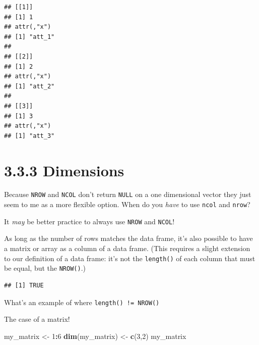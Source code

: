 \documentclass[]{book}
\newenvironment{Shaded}{\begin{snugshade}}{\end{snugshade}}
\newcommand{\DataTypeTok}[1]{\textcolor[rgb]{0.13,0.29,0.53}{#1}}
\newcommand{\DecValTok}[1]{\textcolor[rgb]{0.00,0.00,0.81}{#1}}
\newcommand{\KeywordTok}[1]{\textcolor[rgb]{0.13,0.29,0.53}{\textbf{#1}}}
\newcommand{\NormalTok}[1]{#1}
\newcommand{\OperatorTok}[1]{\textcolor[rgb]{0.81,0.36,0.00}{\textbf{#1}}}
\newcommand{\StringTok}[1]{\textcolor[rgb]{0.31,0.60,0.02}{#1}}
\begin{document}
\begin{verbatim}
## [[1]]
## [1] 1
## attr(,"x")
## [1] "att_1"
## 
## [[2]]
## [1] 2
## attr(,"x")
## [1] "att_2"
## 
## [[3]]
## [1] 3
## attr(,"x")
## [1] "att_3"
\end{verbatim}

\hypertarget{dimensions}{%
\section*{3.3.3 Dimensions}\label{dimensions}}

Because \texttt{NROW} and \texttt{NCOL} don't return \texttt{NULL} on a one dimensional vector they just seem to me as a more flexible option. When do you \emph{have} to use \texttt{ncol} and \texttt{nrow}?

It \emph{may} be better practice to always use \texttt{NROW} and \texttt{NCOL}!

As long as the number of rows matches the data frame, it's also possible to have a matrix or array as a column of a data frame. (This requires a slight extension to our definition of a data frame: it's not the \texttt{length()} of each column that must be equal, but the \texttt{NROW()}.)

\begin{Shaded}
\end{Shaded}

\begin{verbatim}
## [1] TRUE
\end{verbatim}

What's an example of where \texttt{length()\ !=\ NROW()}

The case of a matrix!

\begin{Shaded}
\begin{Highlighting}[]
\NormalTok{my_matrix <-}\StringTok{ }\DecValTok{1}\OperatorTok{:}\DecValTok{6}
\KeywordTok{dim}\NormalTok{(my_matrix) <-}\StringTok{ }\KeywordTok{c}\NormalTok{(}\DecValTok{3}\NormalTok{,}\DecValTok{2}\NormalTok{)}
\NormalTok{my_matrix}
\end{Highlighting}
\end{Shaded}
\end{document}
